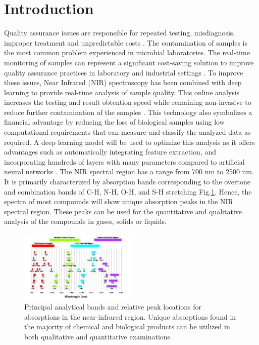 \documentclass[final, 3p, 11pt]{elsarticle}
\begin{document}
\section{Introduction}
Quality assurance issues are responsible for repeated testing, misdiagnosis, improper treatment and unpredictable costs \citep{randox_quality}. The contamination of samples is the most common problem experienced in microbial laboratories. The real-time monitoring of samples can represent a significant cost-saving solution to improve quality assurance practices in laboratory and industrial settings \citep{abatenh2018contamination}. To improve these issues, Near Infrared (NIR) spectroscopy has been combined with deep learning to provide real-time analysis of sample quality. This online analysis increases the testing and result obtention speed while remaining non-invasive to reduce further contamination of the samples \citep{sohn2021gmo}. This technology also symbolizes a financial advantage by reducing the loss of biological samples using low computational requirements that can measure and classify the analyzed data as required. A deep learning model will be used to optimize this analysis as it offers advantages such as automatically integrating feature extraction, and incorporating hundreds of layers with many parameters compared to artificial neural networks \citep{mishra2022hypes}.
The NIR spectral region has a range from 700 nm to 2500 nm. It is primarily characterized by absorption bands corresponding to the overtone and combination bands of C-H, N-H, O-H, and S-H stretching Fig.\ref{fig:analytical_bands}. Hence, the spectra of most compounds will show unique absorption peaks in the NIR spectral region. These peaks can be used for the quantitative and qualitative analysis of the compounds in gases, solids or liquids.

\begin{figure}[h]
        \centering
        \includegraphics[width=0.5\textwidth]{Images/principle_analytical_bands.png}
        \caption{Principal analytical bands and relative peak locations for absorptions in the near-infrared region. Unique absorptions found in the majority of chemical and biological products can be utilized in both qualitative and quantitative examinations}
        \label{fig:analytical_bands}
        \end{figure}
\end{document}
